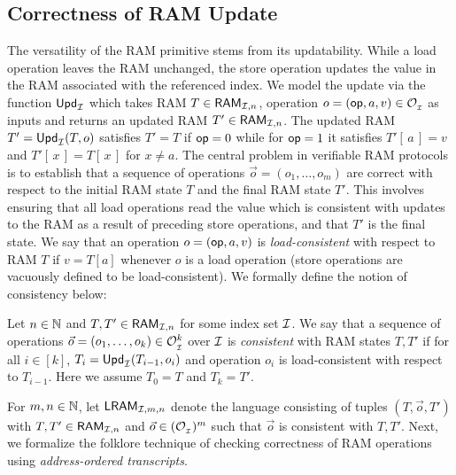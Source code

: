 \subsection{Correctness of RAM Update}\label{subsec:ram-update}
The versatility of the RAM primitive stems from its updatability. While a load operation leaves the RAM unchanged, the store operation
updates the value in the RAM associated with the referenced index. We model the update via the function
$\mathsf{Upd}_{\mathcal{I}}$ which takes RAM $T\in \mathsf{RAM}_{\mathcal{I}, {n}}$, operation
$o=(\mathsf{op},a,v)\in \mathcal{O}_{{}_\mathcal{I}}$ as inputs and returns an updated RAM $T'\in \mathsf{RAM}_{\mathcal{I}, {n}}$.
The updated RAM $T'=\mathsf{Upd}_{\mathcal{I}}(T,o)$ satisfies
$T'=T$ if $\mathsf{op}=0$ while for $\mathsf{op}=1$ it satisfies $T'[\,a\,]=v$  and $T'[\,x\,]=T[\,x\,]$ for $x\neq a$. The central problem
in verifiable RAM protocols is to establish that a sequence of operations $\vec{o}=(o_1,\ldots,o_m)$ are correct with
respect to the initial RAM state $T$ and the final RAM state $T'$. This involves ensuring
that all load operations read the value which is consistent with updates to the RAM as a result of preceding
store operations, and that $T'$ is the final state. We say that an operation $o=(\mathsf{op},a,v)$ is {\em load-consistent}
with respect to RAM $T$ if $v=T[a]$ whenever $o$ is a load operation (store operations are vacuously defined to be load-consistent).
We formally define the notion of consistency below:

\begin{definition}\label{defn:consistent-operations}
    Let $n\in \mathbb{N}$ and $T,T'\in \mathsf{RAM}_{\mathcal{I}, {n}}$ for some index set $\mathcal{I}$. We say that a sequence of operations
    $\vec{o}=(o_1,\ldots,o_k)\in \mathcal{O}_{{}_\mathcal{I}}^k$ over $\mathcal{I}$ is {\em consistent} with RAM states
    $T,T'$ if for all $i\in [k]$, $T_{i}=\mathsf{Upd}_{\mathcal{I}}(T_{i-1},o_i)$ and operation $o_i$ is load-consistent with respect to $T_{i-1}$. Here
    we assume $T_0=T$ and $T_k=T'$.
\end{definition}

For $m,n\in \mathbb{N}$, let $\mathsf{LRAM}_{\mathcal{I},m,n}$ denote the language consisting of tuples $(T,\vec{o},T')$ with $T,T'\in \mathsf{RAM}_{\mathcal{I}, {n}}$ and $\vec{o}\in (\mathcal{O}_{{}_\mathcal{I}})^m$
such that $\vec{o}$ is consistent with $T,T'$.
Next, we formalize the folklore technique of checking correctness of RAM operations
using {\em address-ordered transcripts}.

